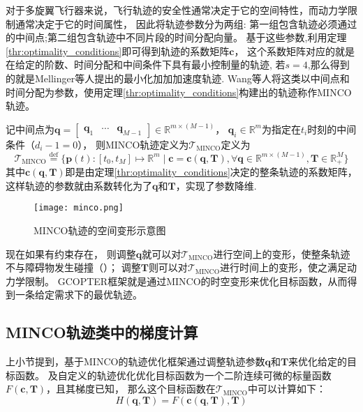 对于多旋翼飞行器来说，飞行轨迹的安全性通常决定于它的空间特性，而动力学限制通常决定于它的时间属性，
因此将轨迹参数分为两组:
第一组包含轨迹必须通过的中间点;第二组包含轨迹中不同片段的时间分配向量。
基于这些参数,利用定理\ref{thr:optimality_conditions}即可得到轨迹的系数矩阵$\bm{c}$，
这个系数矩阵对应的就是在给定的阶数、时间分配和中间条件下具有最小控制量的轨迹,
若$s=4$,那么得到的就是Mellinger等人提出的最小化加加加速度轨迹\cite{2011minimumsnap}.
Wang等人将这类以中间点和时间分配为参数，使用定理\ref{thr:optimality_conditions}构建出的轨迹称作MINCO轨迹\cite{wang2022geometrically}。

记中间点为$\bm{q} = \begin{bmatrix} \bm{q}_1 & \cdots & \bm{q}_{M-1} \end{bmatrix} \in \mathbb{R}^{m \times (M-1)}$，
$\bm{q}_i \in \mathbb{R}^m$为指定在$t_i$时刻的中间条件（$d_i-1=0$），
则MINCO轨迹定义为$\mathscr{T}_{\text{MINCO}}$定义为
\begin{equation}
  \mathscr{T}_{\text{MINCO}} \overset{\text{def}}{=} 
  \{
    \bm{p}(t):[t_0, t_M] \mapsto \mathbb{R}^m \mid \bm{c} = \bm{c}(\bm{q}, \bm{T}), \forall \bm{q} \in \mathbb{R}^{m \times (M-1)}, \bm{T} \in \mathbb{R}_+^{M}
  \}
  \label{equ:definition_of_minco}
\end{equation}
其中$\bm{c}(\bm{q}, \bm{T})$即是由定理\ref{thr:optimality_conditions}决定的整条轨迹的系数矩阵，
这样轨迹的参数就由系数转化为了$\bm{q}$和$\bm{T}$，实现了参数降维.

\begin{figure}[ht]
  \centering
  \texttt{[image: minco.png]}
  \caption{MINCO轨迹的空间变形示意图}
  \label{fig:minco}
\end{figure}

现在如果有约束存在，
则调整$\bm{q}$就可以对$\mathscr{T}_{\text{MINCO}}$进行空间上的变形，使整条轨迹不与障碍物发生碰撞（）；
调整$\bm{T}$则可以对$\mathscr{T}_{\text{MINCO}}$进行时间上的变形，使之满足动力学限制。
GCOPTER框架就是通过MINCO的时空变形来优化目标函数，从而得到一条给定需求下的最优轨迹。

\subsection{MINCO轨迹类中的梯度计算}\label{subsec:gradient_calculation_in_minco}
上小节提到，基于MINCO的轨迹优化框架通过调整轨迹参数$\bm{q}$和$\bm{T}$来优化给定的目标函数。
及自定义的轨迹优化优化目标函数为一个二阶连续可微的标量函数$F(\bm{c}, \bm{T})$，且其梯度已知，
那么这个目标函数在$\mathscr{T}_{\text{MINCO}}$中可以计算如下：
\begin{equation}
  H(\bm{q}, \bm{T}) = F(\bm{c}(\bm{q}, \bm{T}), \bm{T})
  \label{equ:objective_form_in_minco}
\end{equation}

